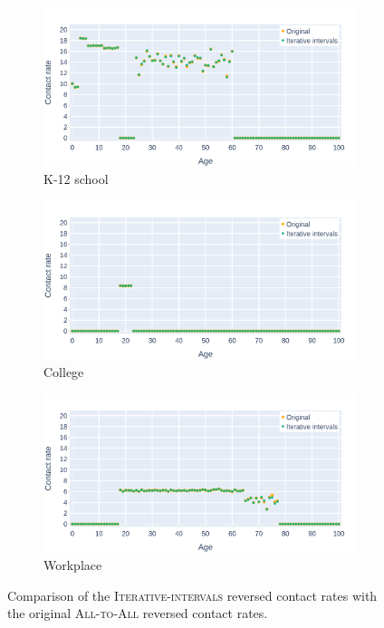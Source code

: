 \begin{figure}
    \centering
    \begin{subfigure}{.8\linewidth}
        \centering
        \includegraphics[width=\textwidth]{4 - Sampling/fig/iterative_intervals/ii_vs_standard_reverse_cr_k12school.png}
        \caption{K-12 school}
        \label{fig:ii_vs_standard_reversed_cr_standard_k12school}
    \end{subfigure}
    \begin{subfigure}{.8\linewidth}
        \centering
        \includegraphics[width=\textwidth]{4 - Sampling/fig/iterative_intervals/ii_vs_standard_reverse_cr_college.png}
        \caption{College}
        \label{fig:ii_vs_standard_reversed_cr_standard_college}
    \end{subfigure}
    \begin{subfigure}{.8\linewidth}
        \centering
        \includegraphics[width=\textwidth]{4 - Sampling/fig/iterative_intervals/ii_vs_standard_reverse_cr_workplace.png}
        \caption{Workplace}
        \label{fig:ii_vs_standard_reversed_cr_standard_workplace}
    \end{subfigure}
    \caption{Comparison of the \textsc{Iterative-intervals} reversed contact rates with the original \textsc{All-to-All} reversed contact rates.}
\end{figure}
